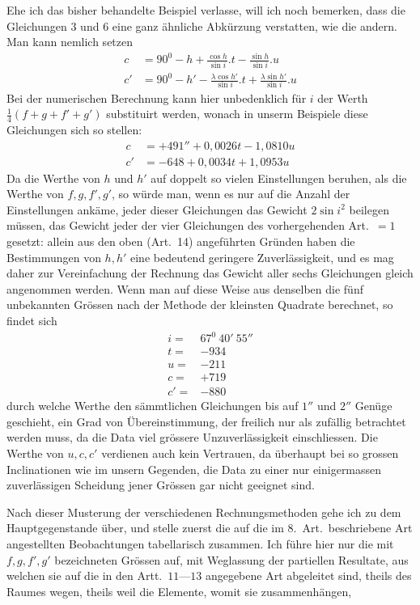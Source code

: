 Ehe ich das bisher behandelte Beispiel verlasse, will ich noch bemerken, dass die Gleichungen $3$ und $6$ eine ganz ähnliche Abkürzung verstatten, wie die andern. Man kann nemlich setzen
\[
\begin{aligned}
c&=90^0-h+\frac{\cos h}{\sin i}.t-\frac{\sin h}{\sin i}.u\\
c'&=90^0-h'-\frac{\lambda\cos h'}{\sin i}.t+\frac{\lambda\sin h'}{\sin i}.u
\end{aligned}
\]
Bei der numerischen Berechnung kann hier unbedenklich für $i$ der Werth
$\frac14(f+g+f'+g')$ substituirt werden, wonach in unserm Beispiele diese Gleichungen sich so stellen:
\[
\begin{aligned}
c&=+491''+0{,}0026t-1{,}0810u\\
c'&=-648+0{,}0034t+1{,}0953u
\end{aligned}
\]
Da die Werthe von $h$ und $h'$ auf doppelt so vielen Einstellungen beruhen, als die Werthe von $f,g,f',g'$, so würde man, wenn es nur auf die Anzahl der Einstellungen ankäme, jeder dieser Gleichungen das Gewicht $2\sin i^2$ beilegen müssen, das Gewicht jeder der vier Gleichungen des vorhergehenden Art.\ $=1$ gesetzt: allein aus den oben (Art.\ 14) angeführten Gründen haben die Bestimmungen von $h,h'$ eine bedeutend geringere Zuverlässigkeit, und es mag daher zur Vereinfachung der Rechnung das Gewicht aller sechs Gleichungen gleich angenommen werden. Wenn man auf diese Weise aus denselben die fünf unbekannten Grössen nach der Methode der kleinsten Quadrate berechnet, so findet sich
\[
\begin{array}{rl}
i=&67^0\ 40'\ 55''\\
t=&-934\\
u=&-211\\
c=&+719\\
c'=&-880
\end{array}
\]
durch welche Werthe den sämmtlichen Gleichungen bis auf $1''$ und $2''$ Genüge geschieht, ein Grad von Übereinstimmung, der freilich nur als zufällig betrachtet werden muss, da die Data viel grössere Unzuverlässigkeit einschliessen. Die Werthe von $u,c,c'$ verdienen auch kein Vertrauen, da überhaupt bei so grossen Inclinationen wie im unsern Gegenden, die Data zu einer nur einigermassen zuverlässigen Scheidung jener Grössen gar nicht geeignet sind.

Nach dieser Musterung der verschiedenen Rechnungsmethoden gehe ich zu dem Hauptgegenstande über, und stelle zuerst die auf die im 8.\ Art.\ beschriebene Art angestellten Beobachtungen tabellarisch zusammen. Ich führe hier nur die mit $f,g,f',g'$ bezeichneten Grössen auf, mit Weglassung der partiellen Resultate, aus welchen sie auf die in den Artt.\ $11$---$13$ angegebene Art abgeleitet sind, theils des Raumes wegen, theils weil die Elemente, womit sie zusammenhängen,
